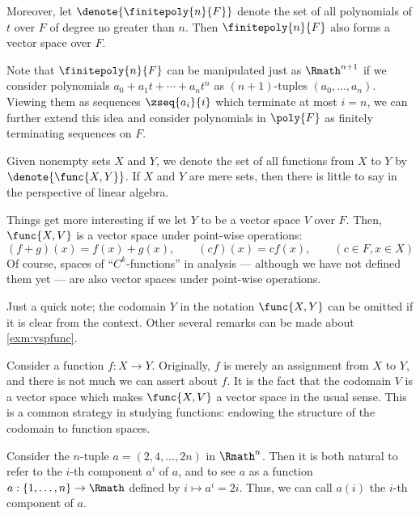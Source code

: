 \begin{example}
\begin{example}[Polynomials]
    Moreover, let \(\denote{\finitepoly{n}{F}}\)
    denote the set of all polynomials of \(t\) over \(F\)
    of degree no greater than \(n\).
    Then \(\finitepoly{n}{F}\) also forms a vector space over \(F\).
\end{example}

Note that
\(\finitepoly{n}{F}\) can be manipulated just as \(\Rmath^{n+1}\)
if we consider polynomials \(a_0+a_1t+\cdots+a_nt^n\)
as \((n+1)\)-tuples \((a_0,\dots,a_n)\).
Viewing them as sequences \(\zseq{a_i}{i}\)
which terminate at most \(i=n\),
we can further extend this idea
and consider polynomials in \(\poly{F}\)
as finitely terminating sequences on \(F\).

\begin{example}
    \label{exm:vspfunc}
    Given nonempty sets \(X\) and \(Y\),
    we denote the set of all functions from \(X\) to \(Y\) by
    \(\denote{\func{X,Y}}\).
    If \(X\) and \(Y\) are mere sets,
    then there is little to say in the perspective of linear algebra.

    Things get more interesting if
    we let \(Y\) to be a vector space \(V\) over \(F\).
    Then, \(\func{X,V}\) is a vector space under point-wise operations:
    \[
        (f+g)(x)=f(x)+g(x),
        \qquad
        (cf)(x)=cf(x),
        \qquad
        (c\in F, x\in X)
    \]
    Of course, spaces of ``\(C^k\)-functions'' in analysis
    --- although we have not defined them yet ---
    are also vector spaces under point-wise operations.
\end{example}

Just a quick note;
the codomain \(Y\) in the notation \(\func{X,Y}\) can be omitted
if it is clear from the context.
Other several remarks can be made about \cref{exm:vspfunc}.

\begin{remark}
    \label{rmk:funcsp1}
    Consider a function \(f:X\to Y\).
    Originally, \(f\) is merely an assignment from \(X\) to \(Y\),
    and there is not much we can assert about \(f\).
    It is the fact that the codomain \(V\) is a vector space
    which makes \(\func{X,V}\) a vector space in the usual sense.
    This is a common strategy in studying functions:
    endowing the structure of the codomain to function spaces.
\end{remark}
\begin{remark}
    \label{rmk:funcsp2}
    Consider the \(n\)-tuple \(a=(2,4,\dots,2n)\) in \(\Rmath^n\).
    Then it is both natural to
    refer to the \(i\)-th component \(a^i\) of \(a\),
    and to see \(a\) as a function \(a:\{1,\dots,n\}\to\Rmath\)
    defined by \(i\mapsto a^i=2i\).
    Thus, we can call \(a(i)\) the \(i\)-th component of \(a\).


\end{remark}
\end{example}
